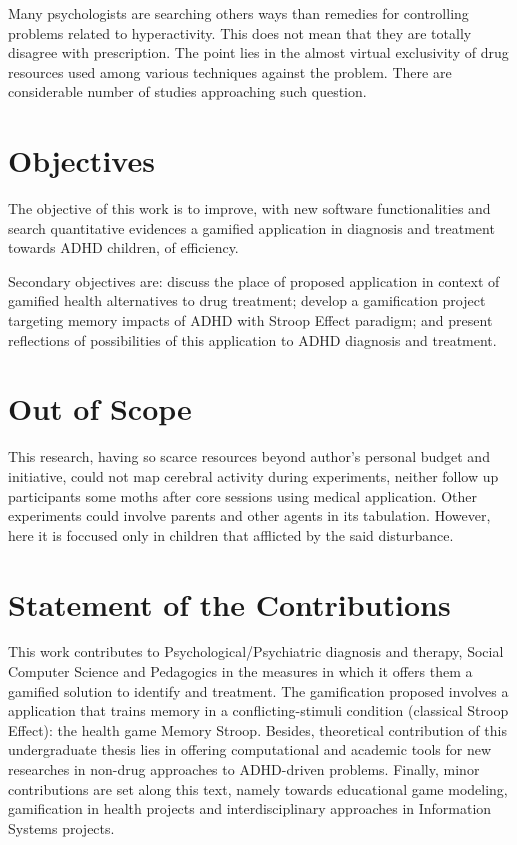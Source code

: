 Many psychologists are searching others ways than remedies for controlling problems related to hyperactivity. This does not mean that they are totally disagree with prescription. The point lies in the almost virtual exclusivity of drug resources used among various techniques against the problem. There are considerable number of studies approaching such question.

\section{Objectives}
\label{sc:objectives}

The objective of this work is to improve, with new software functionalities and search quantitative evidences a gamified application in diagnosis and treatment towards ADHD children, of efficiency. 

Secondary objectives are: discuss the place of proposed application in context of gamified health alternatives to drug treatment; develop a gamification project targeting memory impacts of ADHD with Stroop Effect paradigm; and present reflections of possibilities of this application to ADHD diagnosis and treatment.

\section{Out of Scope}
\label{sc:outofscope}
This research, having so scarce resources beyond author's personal budget and initiative, could not map cerebral activity during experiments, neither follow up participants some moths after core sessions using medical application. Other experiments could involve parents and other agents in its tabulation. However, here it is foccused only in children that afflicted by the said disturbance.


\section{Statement of the Contributions}

This work contributes to Psychological/Psychiatric diagnosis and therapy, Social Computer Science and Pedagogics in the measures in which it offers them a gamified solution to identify and treatment. The gamification proposed involves a application that trains memory in a conflicting-stimuli condition (classical Stroop Effect): the health game Memory Stroop. Besides, theoretical contribution of this undergraduate thesis lies in offering computational and academic tools for new researches in non-drug approaches to ADHD-driven problems. Finally, minor contributions are set along this text, namely towards educational game modeling, gamification in health projects and interdisciplinary approaches in Information Systems projects.

